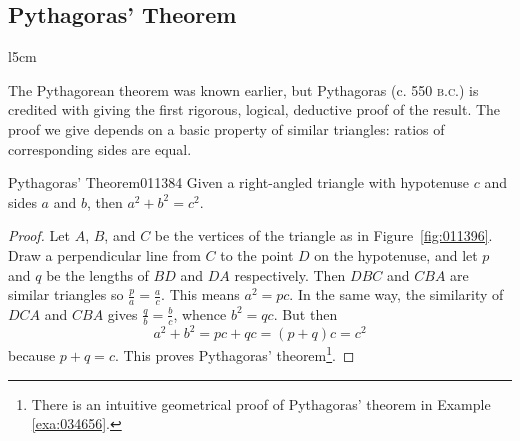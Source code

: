 \subsection*{Pythagoras' Theorem}

\begin{wrapfigure}[4]{l}{5cm} 
\centering

\caption{\label{fig:011396}}
\end{wrapfigure}
The Pythagorean theorem was known earlier, but Pythagoras (c. 550 \textsc{b.c.})
 is credited with giving the first rigorous, logical, deductive proof of
 the result. The proof we give depends on a basic property of similar 
triangles: ratios of corresponding sides are equal.
\vspace{4em}

\begin{theorem}{Pythagoras' Theorem}{011384}
Given a right-angled triangle with hypotenuse $c$ and sides $a$ and $b$, then $a^{2} + b^{2} = c^{2}$.
\end{theorem}

\begin{proof}
Let $A$, $B$, and $C$ be the vertices of the triangle as in Figure~\ref{fig:011396}. Draw a perpendicular line from $C$ to the point $D$ on the hypotenuse, and let $p$ and $q$ be the lengths of $BD$ and $DA$ respectively. Then $DBC$ and $CBA$ are similar triangles so $\frac{p}{a} = \frac{a}{c}$. This means $a^{2} = pc$. In the same way, the similarity of $DCA$ and $CBA$ gives $\frac{q}{b} = \frac{b}{c}$, whence $b^{2} = qc$. But then
\begin{equation*}
a^2 + b^2 = pc + qc = (p +q)c = c^2
\end{equation*}
because $p + q = c$. This proves Pythagoras' theorem\footnote{There is an intuitive geometrical proof of Pythagoras' theorem in Example \ref{exa:034656}.}.
\end{proof}
